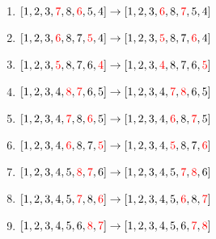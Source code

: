 \documentclass[draft]{article}
\begin{document}
\begin{solution}
\begin{enumerate}[nosep]
        \item $[1,2,3,{\color{red}7},8,{\color{red}6},5,4]\rightarrow [1,2,3,{\color{red}6},8,{\color{red}7},5,4]$
        \item $[1,2,3,{\color{red}6},8,7,{\color{red}5},4]\rightarrow [1,2,3,{\color{red}5},8,7,{\color{red}6},4]$
        \item $[1,2,3,{\color{red}5},8,7,6,{\color{red}4}]\rightarrow [1,2,3,{\color{red}4},8,7,6,{\color{red}5}]$
        \item $[1,2,3,4,{\color{red}8},{\color{red}7},6,5]\rightarrow [1,2,3,4,{\color{red}7},{\color{red}8},6,5]$
        \item $[1,2,3,4,{\color{red}7},8,{\color{red}6},5]\rightarrow [1,2,3,4,{\color{red}6},8,{\color{red}7},5]$
        \item $[1,2,3,4,{\color{red}6},8,7,{\color{red}5}]\rightarrow [1,2,3,4,{\color{red}5},8,7,{\color{red}6}]$
        \item $[1,2,3,4,5,{\color{red}8},{\color{red}7},6]\rightarrow [1,2,3,4,5,{\color{red}7},{\color{red}8},6]$
        \item $[1,2,3,4,5,{\color{red}7},8,{\color{red}6}]\rightarrow [1,2,3,4,5,{\color{red}6},8,{\color{red}7}]$
        \item $[1,2,3,4,5,6,{\color{red}8},{\color{red}7}]\rightarrow [1,2,3,4,5,6,{\color{red}7},{\color{red}8}]$
    \end{enumerate}


\end{solution}
\end{document}
